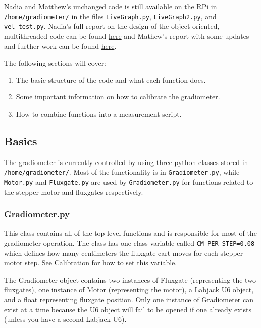 \documentclass{TheMartianReport}
\newcommand{\pyinline}[1]{\texttt{#1}}
\newcommand{\shellinline}[1]{\texttt{#1}}
\begin{document}
Nadia and Matthew's unchanged code is still available on the RPi in \shellinline{/home/gradiometer/} in the files \shellinline{LiveGraph.py}, \shellinline{LiveGraph2.py}, and \shellinline{vel_test.py}. Nadia's full report on the design of the object-oriented, multithreaded code can be found \href{https://ucn.triumf.ca/edm/magnetic-shielding/gradiometer-setup-at-triumf/TRIUMF%20Final%20Report%20Chigmaroff.pdf/view}{here} and Mathew's report with some updates and further work can be found \href{https://ucn.triumf.ca/edm/magnetic-shielding/gradiometer-setup-at-triumf/Gradiometer_Report.pdf/view}{here}.

The following sections will cover:
\begin{enumerate}
	\item The basic structure of the code and what each function does.
	\item Some important information on how to calibrate the gradiometer.
	\item How to combine functions into a measurement script.
\end{enumerate}
\subsection{Basics} \label{subsec:CodeBasics}
The gradiometer is currently controlled by using three python classes stored in \shellinline{/home/gradiometer/}. Most of the functionality is in \shellinline{Gradiometer.py}, while \shellinline{Motor.py} and \shellinline{Fluxgate.py} are used by \shellinline{Gradiometer.py} for functions related to the stepper motor and fluxgates respectively.

\subsubsection{Gradiometer.py}
This class contains all of the top level functions and is responsible for most of the gradiometer operation. The class has one class variable called \pyinline{CM_PER_STEP=0.08} which defines how many centimeters the fluxgate cart moves for each stepper motor step. See \hyperref[subsec:Calibration]{Calibration} for how to set this variable.

The Gradiometer object contains two instances of Fluxgate (representing the two fluxgates), one instance of Motor (representing the motor), a Labjack U6 object, and a float representing fluxgate position.  Only one instance of Gradiometer can exist at a time because the U6 object will fail to be opened if one already exists (unless you have a second Labjack U6).
\end{document}
